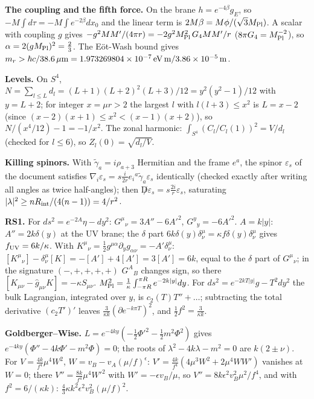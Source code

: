 \documentclass[10pt,a4paper]{article}
\begin{document}
\textbf{The coupling and the fifth force.} On the brane $h=e^{-4\beta}g_E$, so $-M\int d\tau=-M\int e^{-2\beta}dx_0$ and the linear term is $2M\beta=M\phi/(\sqrt3M_{\rm Pl})$. A scalar with coupling $g$ gives $-g^2MM'/(4\pi r)=-2g^2M_{\rm Pl}^2\,G_4MM'/r$ ($8\pi G_4=M_{\rm Pl}^{-2}$), so $\alpha=2(gM_{\rm Pl})^2=\frac23$. The Eöt-Wash bound gives $m_r>\hbar c/38.6\,\mu{\rm m}=1.973269804\times10^{-7}\,{\rm eV\,m}/3.86\times10^{-5}\,{\rm m}$.

\textbf{Levels.} On $S^4$, $N=\sum_{l\le L}d_l=(L+1)(L+2)^2(L+3)/12=y^2(y^2-1)/12$ with $y=L+2$; for integer $x=\mu r>2$ the largest $l$ with $l(l+3)\le x^2$ is $L=x-2$ (since $(x-2)(x+1)\le x^2<(x-1)(x+2)$), so $N/(x^4/12)-1=-1/x^2$. The zonal harmonic: $\int_{S^4}(C_l/C_l(1))^2=V/d_l$ (checked for $l\le6$), so $Z_l(0)=\sqrt{d_l/V}$.

\textbf{Killing spinors.} With $\tilde\gamma_a=i\rho_{a+3}$ Hermitian and the frame $e^a$, the spinor $\varepsilon_s$ of the document satisfies $\nabla_i\varepsilon_s=s\frac i{2r}e_i{}^a\tilde\gamma_a\varepsilon_s$ identically (checked exactly after writing all angles as twice half-angles); then $\not D\varepsilon_s=s\frac{2i}r\varepsilon_s$, saturating $|\lambda|^2\ge nR_{\rm int}/(4(n-1))=4/r^2$.

\textbf{RS1.} For $ds^2=e^{-2A}\eta-dy^2$: $G^\mu{}_\nu=3A''-6A'^2$, $G^y{}_y=-6A'^2$. $A=k|y|$: $A''=2k\delta(y)$ at the UV brane; the $\delta$ part $6k\delta(y)\delta^\mu_\nu=\kappa f\delta(y)\delta^\mu_\nu$ gives $f_{\rm UV}=6k/\kappa$. With $K^\mu{}_\nu=\frac12g^{\mu\alpha}\partial_yg_{\alpha\nu}=-A'\delta^\mu_\nu$: $[K^\mu{}_\nu]-\delta^\mu_\nu[K]=-[A']+4[A']=3[A']=6k$, equal to the $\delta$ part of $G^\mu{}_\nu$; in the signature $(-,+,+,+,+)$ $G^A{}_B$ changes sign, so there $[K_{\mu\nu}-\hat g_{\mu\nu}K]=-\kappa S_{\mu\nu}$. $M_{\rm Pl}^2=\frac1\kappa\int_{-\pi R}^{\pi R}e^{-2k|y|}dy$. For $ds^2=e^{-2kT|y|}g-T^2dy^2$ the bulk Lagrangian, integrated over $y$, is $c_2(T)T''+\dots$; subtracting the total derivative $(c_2T')'$ leaves $\frac3{\kappa k}(\partial e^{-k\pi T})^2$, and $\frac12f^2=\frac3{\kappa k}$.

\textbf{Goldberger–Wise.} $L=e^{-4ky}(-\frac12\Phi'^2-\frac12m^2\Phi^2)$ gives $e^{-4ky}(\Phi''-4k\Phi'-m^2\Phi)=0$; the roots of $\lambda^2-4k\lambda-m^2=0$ are $k(2\pm\nu)$. For $V=\frac{4k}{f^4}\mu^4W^2$, $W=v_B-v_A(\mu/f)^\epsilon$: $V'=\frac{4k}{f^4}(4\mu^3W^2+2\mu^4WW')$ vanishes at $W=0$; there $V''=\frac{8k}{f^4}\mu^4W'^2$ with $W'=-\epsilon v_B/\mu$, so $V''=8k\epsilon^2v_B^2\mu^2/f^4$, and with $f^2=6/(\kappa k)$: $\frac43\kappa k^2\epsilon^2v_B^2(\mu/f)^2$.
\end{document}
